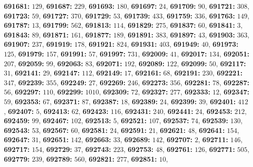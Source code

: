 \textsf{\bfseries 691681:} $129$, \textsf{\bfseries 691687:} $229$, \textsf{\bfseries 691693:} $180$, \textsf{\bfseries 691697:} $24$, \textsf{\bfseries 691709:} $90$, \textsf{\bfseries 691721:} $308$, \textsf{\bfseries 691723:} $59$, \textsf{\bfseries 691727:} $370$, \textsf{\bfseries 691729:} $53$, \textsf{\bfseries 691739:} $433$, \textsf{\bfseries 691759:} $336$, \textsf{\bfseries 691763:} $149$, \textsf{\bfseries 691787:} $13$, \textsf{\bfseries 691799:} $562$, \textsf{\bfseries 691813:} $114$, \textsf{\bfseries 691829:} $275$, \textsf{\bfseries 691837:} $60$, \textsf{\bfseries 691841:} $3$, \textsf{\bfseries 691843:} $89$, \textsf{\bfseries 691871:} $161$, \textsf{\bfseries 691877:} $189$, \textsf{\bfseries 691891:} $383$, \textsf{\bfseries 691897:} $43$, \textsf{\bfseries 691903:} $363$, \textsf{\bfseries 691907:} $237$, \textsf{\bfseries 691919:} $178$, \textsf{\bfseries 691921:} $824$, \textsf{\bfseries 691931:} $403$, \textsf{\bfseries 691949:} $40$, \textsf{\bfseries 691973:} $125$, \textsf{\bfseries 691979:} $157$, \textsf{\bfseries 691991:} $57$, \textsf{\bfseries 691997:} $731$, \textsf{\bfseries 692009:} $41$, \textsf{\bfseries 692017:} $134$, \textsf{\bfseries 692051:} $207$, \textsf{\bfseries 692059:} $99$, \textsf{\bfseries 692063:} $83$, \textsf{\bfseries 692071:} $192$, \textsf{\bfseries 692089:} $122$, \textsf{\bfseries 692099:} $50$, \textsf{\bfseries 692117:} $31$, \textsf{\bfseries 692141:} $29$, \textsf{\bfseries 692147:} $112$, \textsf{\bfseries 692149:} $17$, \textsf{\bfseries 692161:} $68$, \textsf{\bfseries 692191:} $230$, \textsf{\bfseries 692221:} $347$, \textsf{\bfseries 692239:} $355$, \textsf{\bfseries 692249:} $27$, \textsf{\bfseries 692269:} $246$, \textsf{\bfseries 692273:} $356$, \textsf{\bfseries 692281:} $78$, \textsf{\bfseries 692287:} $56$, \textsf{\bfseries 692297:} $110$, \textsf{\bfseries 692299:} $1010$, \textsf{\bfseries 692309:} $72$, \textsf{\bfseries 692327:} $277$, \textsf{\bfseries 692333:} $12$, \textsf{\bfseries 692347:} $59$, \textsf{\bfseries 692353:} $67$, \textsf{\bfseries 692371:} $87$, \textsf{\bfseries 692387:} $18$, \textsf{\bfseries 692389:} $24$, \textsf{\bfseries 692399:} $39$, \textsf{\bfseries 692401:} $412$, \textsf{\bfseries 692407:} $5$, \textsf{\bfseries 692413:} $62$, \textsf{\bfseries 692423:} $116$, \textsf{\bfseries 692431:} $240$, \textsf{\bfseries 692441:} $24$, \textsf{\bfseries 692453:} $212$, \textsf{\bfseries 692459:} $99$, \textsf{\bfseries 692467:} $102$, \textsf{\bfseries 692513:} $5$, \textsf{\bfseries 692521:} $107$, \textsf{\bfseries 692537:} $74$, \textsf{\bfseries 692539:} $130$, \textsf{\bfseries 692543:} $53$, \textsf{\bfseries 692567:} $60$, \textsf{\bfseries 692581:} $24$, \textsf{\bfseries 692591:} $21$, \textsf{\bfseries 692621:} $48$, \textsf{\bfseries 692641:} $154$, \textsf{\bfseries 692647:} $31$, \textsf{\bfseries 692651:} $142$, \textsf{\bfseries 692663:} $33$, \textsf{\bfseries 692689:} $142$, \textsf{\bfseries 692707:} $2$, \textsf{\bfseries 692711:} $146$, \textsf{\bfseries 692717:} $154$, \textsf{\bfseries 692729:} $37$, \textsf{\bfseries 692743:} $223$, \textsf{\bfseries 692753:} $48$, \textsf{\bfseries 692761:} $126$, \textsf{\bfseries 692771:} $505$, \textsf{\bfseries 692779:} $239$, \textsf{\bfseries 692789:} $560$, \textsf{\bfseries 692821:} $277$, \textsf{\bfseries 692851:} $10$, 
